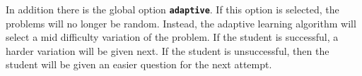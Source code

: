 \documentclass{amsart}
\newcommand\code[1]{{\bfseries\texttt{#1}}}
\begin{document}
In addition there is the global option \code{adaptive}. If this option
is selected, the problems will no longer be random. Instead, the
adaptive learning algorithm will select a mid difficulty variation of
the problem. If the student is successful, a harder variation will be
given next. If the student is unsuccessful, then the student will be
given an easier question for the next attempt.
\end{document}
